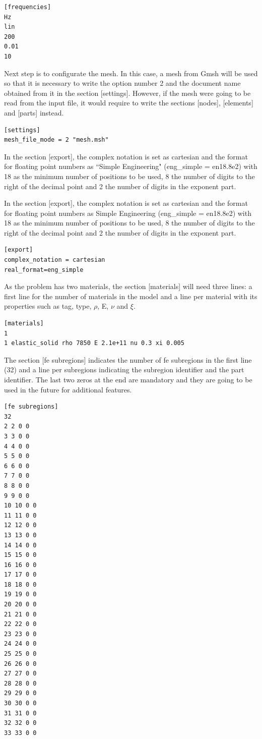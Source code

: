 \documentclass[a4]{article}
\begin{document}
\begin{Verbatim}
[frequencies]
Hz
lin
200
0.01
10
\end{Verbatim}

Next step is to configurate the mesh. In this case, a mesh from Gmsh will be used so that it is necessary to write the option number 2 and the document name obtained from it in the section [settings]. However, if the mesh were going to be read from the input file, it would require to write the sections [nodes], [elements] and [parts] instead.

\begin{Verbatim}	
[settings]
mesh_file_mode = 2 "mesh.msh"
\end{Verbatim}


In the section [export], the complex notation is set as cartesian and the format for floating point numbers as ``Simple Engineering" (eng\_simple = en18.8e2) with 18 as the minimum number of positions to be used, 8 the number of digits to the right of the decimal point and 2 the number of digits in the exponent part. 

In the section [export], the complex notation is set as cartesian and the format for floating point numbers as Simple Engineering (eng\_simple = en18.8e2) with 18 as the minimum number of positions to be used, 8 the number of digits to the right of the decimal point and 2 the number of digits in the exponent part. 


\begin{Verbatim}
[export]
complex_notation = cartesian
real_format=eng_simple
\end{Verbatim}

As the problem has two materials, the section [materials] will need three lines: a first line for the number of materials in the model and a line per material with its properties such as tag, type, $\rho$, E, $\nu$ and $ \xi $.

\begin{Verbatim}
[materials]
1
1 elastic_solid rho 7850 E 2.1e+11 nu 0.3 xi 0.005
\end{Verbatim}

The section [fe subregions] indicates the number of fe subregions in the first line (32) and a line per subregions indicating the subregion identifier and the part identifier. The last two zeros at the end are mandatory and they are going to be used in the future for additional features.

\begin{Verbatim}
[fe subregions]
32
2 2 0 0
3 3 0 0
4 4 0 0
5 5 0 0
6 6 0 0
7 7 0 0
8 8 0 0
9 9 0 0
10 10 0 0
11 11 0 0
12 12 0 0
13 13 0 0
14 14 0 0
15 15 0 0
16 16 0 0
17 17 0 0
18 18 0 0
19 19 0 0
20 20 0 0
21 21 0 0
22 22 0 0
23 23 0 0
24 24 0 0
25 25 0 0
26 26 0 0
27 27 0 0
28 28 0 0
29 29 0 0
30 30 0 0
31 31 0 0
32 32 0 0
33 33 0 0
\end{Verbatim}
\end{document}
